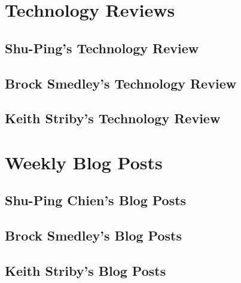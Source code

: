\documentclass[letterpaper,10pt,serif,draftclsnofoot,onecolumn,compsoc,titlepage]{IEEEtran}
\begin{document}
	

\newpage

\section{Technology Reviews}

	\subsection{Shu-Ping's Technology Review}

		

	\newpage

	\subsection{Brock Smedley's Technology Review}

		

	\newpage

	\subsection{Keith Striby's Technology Review}

		

	\newpage

\section{Weekly Blog Posts}
	\subsection{Shu-Ping Chien's Blog Posts}

		

	\newpage

	\subsection{Brock Smedley's Blog Posts}

		

	\newpage
	
	\subsection{Keith Striby's Blog Posts}
\end{document}
